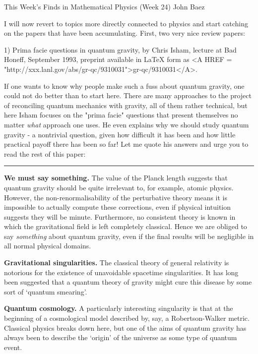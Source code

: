 

This Week's Finds in Mathematical Physics (Week 24)
John Baez

I will now revert to topics more directly connected to physics and start
catching on the papers that have been accumulating.  First, two very
nice review papers:

1) Prima facie questions in quantum gravity, by Chris Isham, lecture at
Bad Honeff, September 1993, preprint available in LaTeX form as
<A HREF = "http://xxx.lanl.gov/abs/gr-qc/9310031">gr-qc/9310031</A>. 

If one wants to know why people make such a fuss about quantum gravity,
one could not do better than to start here.  There are many approaches
to the project of reconciling quantum mechanics with gravity, all of
them rather technical, but here Isham focuses on the "prima facie"
questions that present themselves no matter \emph{what} approach one uses.  
He even explains why we should study quantum gravity - a nontrivial
question, given how difficult it has been and how little practical
payoff there has been so far!  Let me quote his answers and urge you to 
read the rest of this paper:

\par\noindent\rule{\textwidth}{0.4pt}
\textbf{We must say something.}  The value of the Planck length suggests that
quantum gravity should be quite irrelevant to, for example, atomic
physics.  However, the non-renormalisability of the perturbative theory
means it is impossible to actually compute these corrections, even if
physical intuition suggests they will be minute.  Furthermore, no
consistent theory is known in which the gravitational field is left
completely classical.  Hence we are obliged to say \emph{something} about
quantum gravity, even if the final results will be negligible in all
normal physical domains.

\textbf{Gravitational singularities.}  The classical theory of
general relativity is notorious for the existence of unavoidable
spacetime singularities.  It has long been suggested that a quantum
theory of gravity might cure this disease by some sort of `quantum
smearing'.

\textbf{Quantum cosmology.}  A particularly interesting singularity
is that at the beginning of a cosmological model described by, say, a
Robertson-Walker metric.  Classical physics breaks down here, but one
of the aims of quantum gravity has always been to describe the
`origin' of the universe as some type of quantum event.

